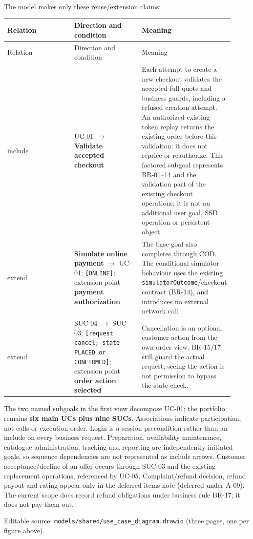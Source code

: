 The model makes only these reuse/extension claims:

\begin{longtable}{>{\raggedright\arraybackslash}p{0.3067\linewidth}>{\raggedright\arraybackslash}p{0.3067\linewidth}>{\raggedright\arraybackslash}p{0.3067\linewidth}}
Relation & Direction and condition & Meaning \\
\hline\endfirsthead
Relation & Direction and condition & Meaning \\
\hline\endhead
\guillemotleft{}include\guillemotright{} & UC-01 \ensuremath{\rightarrow} \textbf{Validate accepted checkout} & Each attempt to create a new checkout validates the accepted full quote and business guards, including a refused creation attempt. An authorized existing-token replay returns the existing order before this validation; it does not reprice or reauthorize. This factored subgoal represents BR-01--14 and the validation part of the existing checkout operations; it is not an additional user goal, SSD operation or persistent object. \\
\guillemotleft{}extend\guillemotright{} & \textbf{Simulate online payment} \ensuremath{\rightarrow} UC-01; \texttt{[ONLINE]}; extension point \textbf{payment authorization} & The base goal also completes through COD. The conditional simulator behaviour uses the existing \texttt{simulatorOutcome}/checkout contract (BR-14), and introduces no external network call. \\
\guillemotleft{}extend\guillemotright{} & SUC-04 \ensuremath{\rightarrow} SUC-03; \texttt{[request cancel; state PLACED or CONFIRMED]}; extension point \textbf{order action selected} & Cancellation is an optional customer action from the own-order view. BR-15/17 still guard the actual request; seeing the action is not permission to bypass the state check. \\
\end{longtable}
The two named subgoals in the first view decompose UC-01; the portfolio remains \textbf{six main UCs plus nine SUCs}. Associations indicate participation, not calls or execution order. Login is a session precondition rather than an include on every business request. Preparation, availability maintenance, catalogue administration, tracking and reporting are independently initiated goals, so sequence dependencies are not represented as include arrows. Customer acceptance/decline of an offer occurs through SUC-03 and the existing replacement operations, referenced by UC-05. Complaint/refund decision, refund payout and rating appear only in the deferred-items note (deferred under A-09). The current scope does record refund obligations under business rule BR-17; it does not pay them out.

Editable source: \texttt{models/\allowbreak{}shared/\allowbreak{}use\_\allowbreak{}case\_\allowbreak{}diagram.\allowbreak{}drawio} (three pages, one per figure above).
